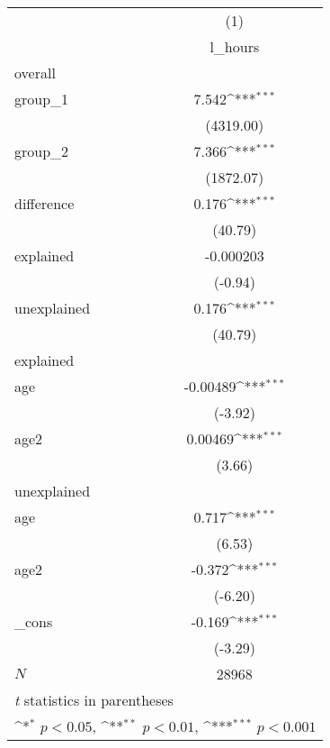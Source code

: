 \begin{table}
    \begin{center}
\def\sym#1{\ifmmode^{#1}\else\(^{#1}\)\fi}
\begin{tabular}{l*{1}{c}}
\hline\hline
            &\multicolumn{1}{c}{(1)}\\
            &\multicolumn{1}{c}{l\_hours}\\
\hline
overall     &                     \\
group\_1     &       7.542\sym{***}\\
            &   (4319.00)         \\
[1em]
group\_2     &       7.366\sym{***}\\
            &   (1872.07)         \\
[1em]
difference  &       0.176\sym{***}\\
            &     (40.79)         \\
[1em]
explained   &   -0.000203         \\
            &     (-0.94)         \\
[1em]
unexplained &       0.176\sym{***}\\
            &     (40.79)         \\
\hline
explained   &                     \\
age         &    -0.00489\sym{***}\\
            &     (-3.92)         \\
[1em]
age2        &     0.00469\sym{***}\\
            &      (3.66)         \\
\hline
unexplained &                     \\
age         &       0.717\sym{***}\\
            &      (6.53)         \\
[1em]
age2        &      -0.372\sym{***}\\
            &     (-6.20)         \\
[1em]
\_cons      &      -0.169\sym{***}\\
            &     (-3.29)         \\
\hline
\(N\)       &       28968         \\
\hline\hline
\multicolumn{2}{l}{\footnotesize \textit{t} statistics in parentheses}\\
\multicolumn{2}{l}{\footnotesize \sym{*} \(p<0.05\), \sym{**} \(p<0.01\), \sym{***} \(p<0.001\)}\\
\end{tabular}
\end{center}
\end{table}